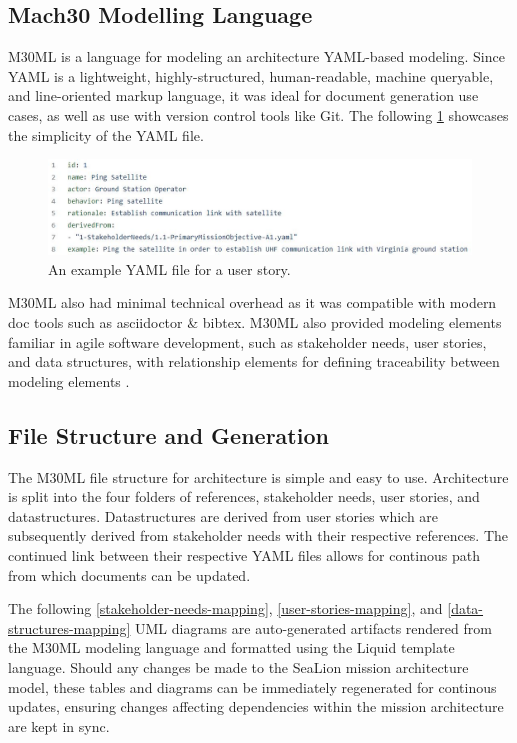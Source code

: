 \documentclass[conf]{new-aiaa}
\begin{document}
\subsection{Mach30 Modelling Language}

M30ML is a language for modeling an architecture YAML-based modeling. Since YAML is a lightweight, highly-structured, human-readable, machine queryable, and line-oriented markup language, it was ideal for document generation use cases, as well as use with version control tools like Git. The following \ref{user_story} showcases the simplicity of the YAML file.

\begin{figure}[hbt!]
    \centering
    \includegraphics[width=.5\textwidth]{ping_satellite}
    \caption{An example YAML file for a user story.}
    \label{user_story}
\end{figure}

M30ML also had minimal technical overhead as it was compatible with modern doc tools such as asciidoctor \& bibtex. M30ML also provided modeling elements familiar in agile software development, such as stakeholder needs, user stories, and data structures, with relationship elements for defining traceability between modeling elements \cite{mach30_git}.

\subsection{File Structure and Generation}

The M30ML file structure for architecture is simple and easy to use. Architecture is split into the four folders of references, stakeholder needs, user stories, and datastructures. Datastructures are derived from user stories which are subsequently derived from stakeholder needs with their respective references. The continued link between their respective YAML files allows for continous path from which documents can be updated.

The following \ref{stakeholder-needs-mapping}, \ref{user-stories-mapping}, and \ref{data-structures-mapping} UML diagrams are auto-generated artifacts rendered from the M30ML modeling language and formatted using the Liquid template language. Should any changes be made to the SeaLion mission architecture model, these tables and diagrams can be immediately regenerated for continous updates, ensuring changes affecting dependencies within the mission architecture are kept in sync.
\end{document}
